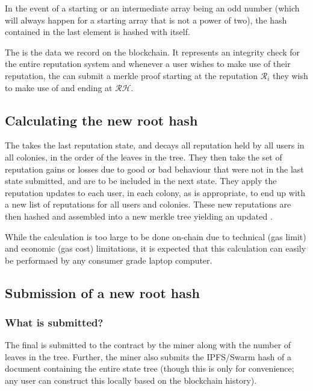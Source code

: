 In the event of a starting or an intermediate array being an odd number (which will always happen for a starting array that is not a power of two), the hash contained in the last element is hashed with itself.

The  is the data we record on the blockchain. It represents an integrity check for the entire reputation system and whenever a user wishes to make use of their reputation, the can submit a merkle proof starting at the reputation $\mathcal{R}_i$ they wish to make use of and ending at $\mathcal{RH}$.

\subsection{Calculating the new root hash}
The \rcth takes the last reputation state, and decays all reputation held by all users in all colonies, in the order of the leaves in the tree. They then take the set of reputation gains or losses due to good or bad behaviour that were not in the last state submitted, and are to be included in the next state. They apply the reputation updates to each user, in each colony, as is appropriate, to end up with a new list of reputations for all users and colonies. These new reputations are then hashed and assembled into a new merkle tree yielding an updated .

While the calculation is too large to be done on-chain due to technical (gas limit) and economic (gas cost) limitations, it is expected that this calculation can easily be performaed by any consumer grade laptop computer.

\subsection{Submission of a new root hash}
%
\subsubsection*{What is submitted?}
The final  is submitted to the contract by the miner along with the number of leaves in the tree. Further, the miner also submits the IPFS/Swarm hash of a document containing the entire state tree (though this is only for convenience; any user can construct this locally based on the blockchain history).
%
